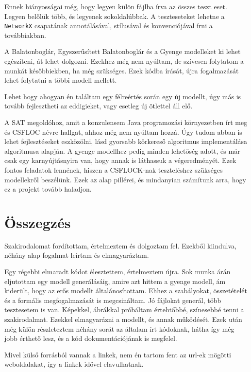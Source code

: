 \documentclass[
]{thesis-ekf}
\theoremstyle{definition}
\theoremstyle{remark}
\begin{document}
	Ennek hiányosságai még, hogy legyen külön fájlba írva az összes teszt eset. Legyen belőlük több, és legyenek sokoldalúbbak. A teszteseteket lehetne a \texttt{NetworkX} csapatának annotálásával, stílusával és konvenciójával írni a továbbiakban.
	
	A Balatonboglár, Egyszerűsített Balatonboglár és a Gyenge modelleket ki lehet egészíteni, át lehet dolgozni. Ezekhez még nem nyúltam, de szívesen folytatom a munkát későbbiekben, ha még szükséges. Ezek kódba írását, újra fogalmazását lehet folytatni a többi modell mellett.

	Lehet hogy ahogyan én találtam egy félreértés során egy új modellt, úgy más is tovább fejlesztheti az eddigieket, vagy esetleg új ötlettel áll elő.

	A \textsc{SAT} megoldóhoz, amit a konzulensem Java programozási környezetben írt meg és \textsc{CSFLOC} névre hallgat, ahhoz még nem nyúltam hozzá. Úgy tudom abban is lehet fejlesztéseket eszközölni, lásd gyorsabb körkereső algoritmus implementálása \cite[Johnson]{johnson} algoritmusa alapján. A gyenge modellhez pedig minden lehetőség adott, és már csak egy karnyújtásnyira van, hogy annak is láthassuk a végeredményét. Ezek fontos feladatok lennének, hiszen a \textsc{CSFLOCK}-nak teszteléshez szükséges modellekről beszélünk. Ezek az alap pillérei, és mindanyian számítunk arra, hogy ez a projekt tovább haladjon.
	
\chapter*{Összegzés}
	Szakirodalomat fordítottam, értelmeztem és dolgoztam fel. Ezekből kiindulva, néhány alap fogalmat leírtam és elmagyaráztam.

	Egy régebbi elmaradt kódot élesztettem, értelmeztem újra. Sok munka árán eljutottam egy modell generálásáig, amire azt hittem a gyenge modell, ám kiderült, hogy az erős modellt általánosítottam. Ehhez a szabályokat, összetételét és a formális megfogalmazását is megcsináltam. Jó fájlokat generál, több tesztesetem is van. Képekkel, ábrákkal próbáltam értehtőbbé, színesebbé tenni a szakirodalmat. Ezekkel elmagyarázni a modellt, és annak működését. Ezek után még külön részleteztem néhány sorát az általam írt kódoknak, hátha így még jobb érthető lesz, és a kód dokumentációjának is megfelel.

	Mivel külső forrásból vannak a linkek, nem én tartom fent az url-ek mögötti weboldalakat, így a linkek idővel elavulhatnak.
	
\end{document}

